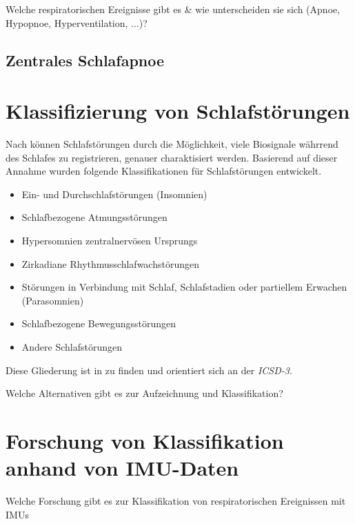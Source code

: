 Welche respiratorischen Ereignisse gibt es \& wie unterscheiden sie sich (Apnoe, Hypopnoe, Hyperventilation, ...)?

\subsection{Zentrales Schlafapnoe}


\section{Klassifizierung von Schlafstörungen}
Nach \cite{praxis_der_schlafmedizin} können Schlafstörungen durch die Möglichkeit, viele Biosignale währrend des Schlafes zu registrieren, genauer charaktisiert werden.
Basierend auf dieser Annahme wurden folgende Klassifikationen für Schlafstörungen entwickelt.
\begin{itemize}
    \item Ein- und Durchschlafstörungen (Insomnien)
    \item Schlafbezogene Atmungsstörungen
    \item Hypersomnien zentralnervösen Ursprungs
    \item Zirkadiane Rhythmusschlafwachstörungen
    \item Störungen in Verbindung mit Schlaf, Schlafstadien oder partiellem Erwachen (Parasomnien)
    \item Schlafbezogene Bewegungsstörungen
    \item Andere Schlafstörungen
\end{itemize}

Diese Gliederung ist in \cite{praxis_der_schlafmedizin} zu finden und orientiert sich an der \textit{ICSD-3}.

Welche Alternativen gibt es zur Aufzeichnung und Klassifikation?

\section{Forschung von Klassifikation anhand von IMU-Daten}
Welche Forschung gibt es zur Klassifikation von respiratorischen Ereignissen mit IMUs